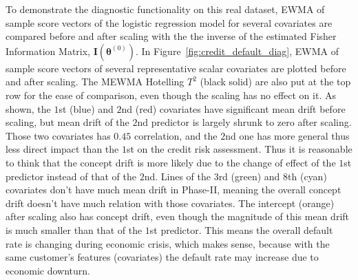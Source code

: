 \documentclass[twoside,11pt]{article}
\begin{document}
To demonstrate the diagnostic functionality on this real dataset, EWMA of sample score vectors of the logistic regression model for several covariates are compared before and after scaling with the the inverse of the estimated Fisher Information Matrix, $\mathbf {I} ( {\bm{\theta}} ^{(0)})$. In Figure~\ref{fig:credit_default_diag}, EWMA of sample score vectors of several representative scalar covariates are plotted before and after scaling. The MEWMA Hotelling $T^2$ (black solid) are also put at the top row for the ease of comparison, even though the scaling has no effect on it. As shown, the $1$st (blue) and $2$nd (red) covariates have significant mean drift before scaling, but mean drift of the $2$nd predictor is largely shrunk to zero after scaling. Those two covariates has $0.45$ correlation, and the $2$nd one has more general thus less direct impact than the $1$st on the credit risk assessment. Thus it is reasonable to think that the concept drift is more likely due to the change of effect of the $1$st predictor instead of that of the $2$nd. Lines of the $3$rd (green) and $8$th (cyan) covariates don't have much mean drift in Phase-II, meaning the overall concept drift doesn't have much relation with those covariates. The intercept (orange) after scaling also has concept drift, even though the magnitude of this mean drift is much smaller than that of the $1$st predictor. This means the overall default rate is changing during economic crisis, which makes sense, because with the same customer's features (covariates) the default rate may increase due to economic downturn. 
\end{document}
